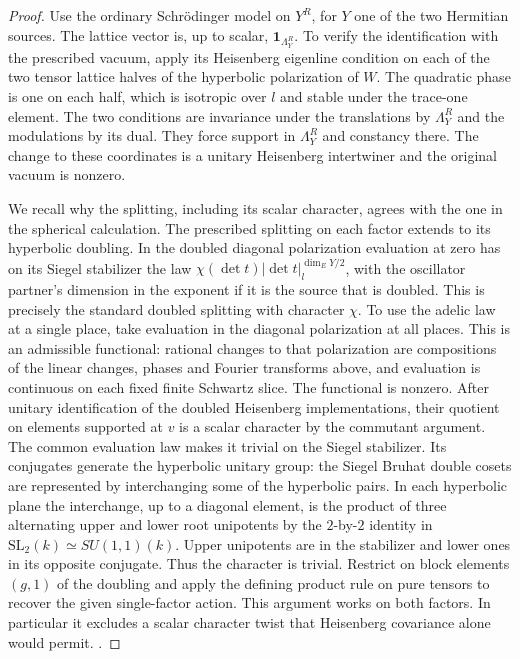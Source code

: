 \begin{proof}
Use the ordinary Schr\"odinger model on \(Y^R\), for \(Y\) one of the
two Hermitian sources. The lattice vector is, up to scalar,
\(\mathbf1_{\Lambda_Y^R}\). To verify the identification with the
prescribed vacuum, apply its Heisenberg eigenline condition on each
of the two tensor lattice halves of the hyperbolic polarization of
\(W\). The quadratic phase is one on each half, which is isotropic
over \(l\) and stable under the trace-one element. The two conditions
are invariance under the translations by \(\Lambda_Y^R\) and the
modulations by its dual. They force support in \(\Lambda_Y^R\) and
constancy there. The change to these coordinates is a unitary
Heisenberg intertwiner and the original vacuum is nonzero.

We recall why the splitting, including its scalar character, agrees
with the one in the spherical calculation. The prescribed splitting
on each factor extends to its hyperbolic doubling. In the doubled
diagonal polarization evaluation at zero has on its Siegel stabilizer
the law \(\chi(\det t)|\det t|_l^{\dim_EY/2}\), with the oscillator
partner's dimension in the exponent if it is the source that is
doubled. This is precisely the standard doubled splitting with
character \(\chi\). To use the adelic law at a single place, take
evaluation in the diagonal polarization at all places. This is an
admissible functional: rational changes to that polarization are
compositions of the linear changes, phases and Fourier transforms
above, and evaluation is continuous on each fixed finite Schwartz
slice. The functional is nonzero. After unitary identification of the
doubled Heisenberg implementations, their quotient on elements
supported at \(v\) is a scalar character by the commutant argument.
The common evaluation law makes it trivial on the Siegel stabilizer.
Its conjugates generate the hyperbolic unitary group: the Siegel
Bruhat double cosets are represented by interchanging some of the
hyperbolic pairs. In each hyperbolic plane the interchange, up to
a diagonal element, is the product of three alternating upper and
lower root unipotents by the \(2\)-by-\(2\) identity in
\(\mathrm{SL}_2(k)\simeq SU(1,1)(k)\). Upper unipotents are in the
stabilizer and lower ones in its opposite conjugate. Thus the
character is trivial. Restrict on block elements \((g,1)\) of the
doubling and apply the defining product rule on pure tensors to
recover the given single-factor action. This argument works on both
factors. In particular it excludes a scalar character twist that
Heisenberg covariance alone would permit.
.


\end{proof}

